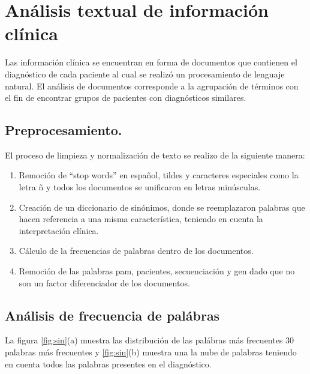 \section{Análisis textual de información clínica}

Las información clínica se encuentran en forma de documentos que contienen el diagnóstico de cada paciente al cual se realizó un procesamiento de lenguaje natural. El análisis de documentos corresponde a la agrupación de términos con el fin de encontrar grupos de pacientes con diagnósticos similares. 
 
\subsection{Preprocesamiento.}
    
El proceso de limpieza y normalización de texto se realizo de la siguiente manera:

 \begin{enumerate}
	\item Remoción de ``stop words'' en español, tildes y caracteres especiales como la letra ñ y todos los documentos se unificaron en letras minúsculas.
	\item Creación de un diccionario de sinónimos, donde se reemplazaron palabras que hacen referencia a una misma característica, teniendo en cuenta la interpretación clínica. 
	\item Cálculo de la frecuencias de palabras dentro de los documentos. 
	\item Remoción de las palabras pam, pacientes, secuenciación y gen dado que no son un factor diferenciador de los documentos.  	  
\end{enumerate}


\subsection{Análisis de frecuencia de palábras}

La figura \ref{fig:sin}(a) muestra las distribución de las palábras más frecuentes 30 palabras más frecuentes y \ref{fig:sin}(b) muestra una la nube de palabras teniendo en cuenta todos las palabras presentes en el diagnóstico. \\

